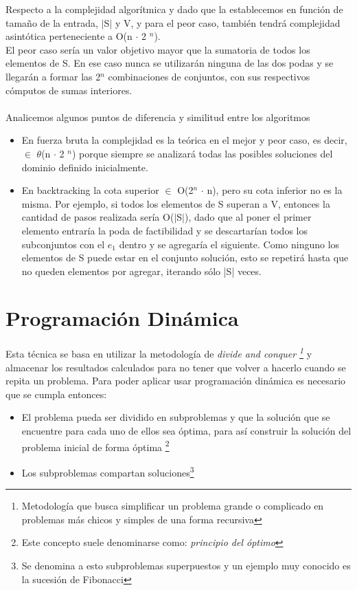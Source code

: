 \documentclass[10pt,a4paper]{article}
\begin{document}
Respecto a la complejidad algorítmica y dado que la establecemos en función de tamaño de la entrada, $|$S$|$ y V, y para el peor caso, también tendrá complejidad asintótica perteneciente a O(n $\cdot$ 2 $^{n}$).\\
El peor caso sería un valor objetivo mayor que la sumatoria de todos los elementos de S. En ese caso nunca se utilizarán ninguna de las dos podas y se llegarán a formar las 2$^{n}$ combinaciones de conjuntos, con sus respectivos cómputos de sumas interiores.\\ \\
Analicemos algunos puntos de diferencia y similitud entre los algoritmos
\begin{itemize}
	\item En fuerza bruta la complejidad es la teórica en el mejor y peor caso, es decir, $\in$ $\theta$(n $\cdot$ 2 $^{n}$) porque siempre se analizará todas las posibles soluciones del dominio definido inicialmente.


	\item En backtracking la cota superior $\in$ O(2$^{n}$ $\cdot$ n), pero su cota inferior no es la misma. Por ejemplo, si todos los elementos de S superan a V, entonces la cantidad de pasos realizada sería O($|$S$|$), dado que al poner el primer elemento entraría la poda de factibilidad y se descartarían todos los subconjuntos con el $e_1$ dentro y se agregaría el siguiente. Como ninguno los elementos de S puede estar en el conjunto solución, esto se repetirá hasta que no queden elementos por agregar, iterando sólo |S| veces.
	
\end{itemize}

\section{Programación Dinámica}

Esta técnica se basa en utilizar la metodología de {\it divide and conquer \footnote{Metodología que busca simplificar un problema grande o complicado en problemas más chicos y simples de una forma recursiva}} y almacenar los resultados calculados para no tener que volver a hacerlo cuando se repita un problema. Para poder aplicar usar programación dinámica es necesario que se cumpla entonces: 
\begin{itemize}
	\item
	El problema pueda ser dividido en subproblemas y que la solución que se encuentre para cada uno de ellos sea óptima, para así construir la solución del problema inicial de forma óptima \footnote{Este concepto suele denominarse como: {\it principio del óptimo}}
	
	\item 	
	Los subproblemas compartan soluciones\footnote{Se denomina a esto subproblemas superpuestos y un ejemplo muy conocido es la sucesión de Fibonacci}
\end{itemize}
\end{document}
